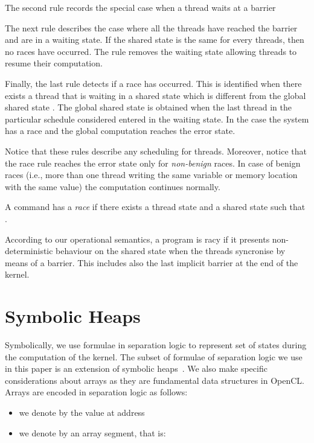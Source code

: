 \documentclass[a4paper,11pt]{llncs}
\newcounter{note_number}
\begin{document}
The second rule records the special case when a thread
waits at a barrier


The next rule describes the case where all the threads have reached the barrier and are in a waiting state. If the shared state  is the same for every threads, then no races have occurred. The rule removes the waiting state allowing threads to resume their computation.

Finally, the last rule detects if a race has occurred. This is identified when there exists a thread  that is waiting in a shared state  which is different from the global shared state . The global shared state is  obtained when the last thread in the particular schedule considered entered in the waiting state.  In the case the system has a race and  the global computation reaches the error state.

Notice that these rules describe any scheduling for threads. Moreover, notice that the race rule reaches the error state only for {\em non-benign} races. 
In case of benign races (i.e., more than one thread writing the same variable or memory location with the same value) the computation continues normally. 
\begin{definition}
A command  has a {\em race} if there exists a thread state  and a shared state  such that .
\end{definition}
According to our operational semantics, a program is racy if it presents non-deterministic behaviour on the shared state when the threads syncronise by means of a barrier. This includes also the last implicit barrier at the end of the kernel.

\section{Symbolic Heaps}
\label{sec:symbolic-heaps}
Symbolically, we use formulae in separation logic to represent set of states
during the computation of the kernel.
The subset of formulae of separation logic we use in this paper is an extension of symbolic heaps~\cite{DistefanoOHearnYang06}. We also make specific considerations about arrays as they are fundamental data structures in OpenCL.\\

\noindent
Arrays are encoded in separation logic as follows:
\begin{itemize}
 \item we denote by  the value at address 
 \item we denote by  an array segment, that is:
 	
\end{itemize}
\end{document}

